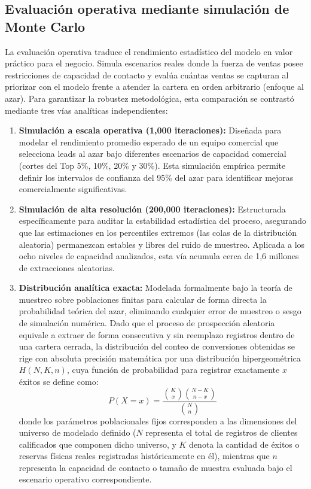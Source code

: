 \subsection{Evaluación operativa mediante simulación de Monte Carlo}
La evaluación operativa traduce el rendimiento estadístico del modelo en valor práctico para el negocio. Simula escenarios reales donde la fuerza de ventas posee restricciones de capacidad de contacto y evalúa cuántas ventas se capturan al priorizar con el modelo frente a atender la cartera en orden arbitrario (enfoque al azar). Para garantizar la robustez metodológica, esta comparación se contrastó mediante tres vías analíticas independientes:
\begin{enumerate}
    \item \textbf{Simulación a escala operativa (1{,}000 iteraciones):} Diseñada para modelar el rendimiento promedio esperado de un equipo comercial que selecciona leads al azar bajo diferentes escenarios de capacidad comercial (cortes del Top 5\%, 10\%, 20\% y 30\%). Esta simulación empírica permite definir los intervalos de confianza del 95\% del azar para identificar mejoras comercialmente significativas.
    \item \textbf{Simulación de alta resolución (200{,}000 iteraciones):} Estructurada específicamente para auditar la estabilidad estadística del proceso, asegurando que las estimaciones en los percentiles extremos (las colas de la distribución aleatoria) permanezcan estables y libres del ruido de muestreo. Aplicada a los ocho niveles de capacidad analizados, esta vía acumula cerca de 1{,}6 millones de extracciones aleatorias.
    \item \textbf{Distribución analítica exacta:} Modelada formalmente bajo la teoría de muestreo sobre poblaciones finitas para calcular de forma directa la probabilidad teórica del azar, eliminando cualquier error de muestreo o sesgo de simulación numérica. Dado que el proceso de prospección aleatoria equivale a extraer de forma consecutiva y sin reemplazo registros dentro de una cartera cerrada, la distribución del conteo de conversiones obtenidas se rige con absoluta precisión matemática por una distribución hipergeométrica $H(N, K, n)$, cuya función de probabilidad para registrar exactamente $x$ éxitos se define como:
    \begin{equation}
    P(X = x) = \frac{\binom{K}{x}\binom{N-K}{n-x}}{\binom{N}{n}}
    \end{equation}
    donde los parámetros poblacionales fijos corresponden a las dimensiones del universo de modelado definido ($N$ representa el total de registros de clientes calificados que componen dicho universo, y $K$ denota la cantidad de éxitos o reservas físicas reales registradas históricamente en él), mientras que $n$ representa la capacidad de contacto o tamaño de muestra evaluada bajo el escenario operativo correspondiente.


\end{enumerate}
